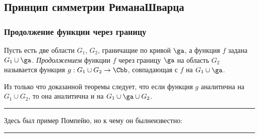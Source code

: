 \documentclass[a4paper]{article}
\newenvironment{petit}
{\par \smallskip \hrule \smallskip \footnotesize}
{\par \smallskip \hrule \smallskip}
\begin{document}
\subsection{Принцип симметрии Римана\ч Шварца}

\subsubsection{Продолжение функции через границу}

\begin{df}
Пусть есть две области $G_1$, $G_2$, граничащие по кривой $\ga$, а функция $f$ задана $G_1\cup\ga$.
\emph{Продолжением} функции $f$ через границу $\ga$ на область $G_2$ называется функция $g:G_1\cup G_2\to\Cbb$,
совпадающая с $f$ на $G_1\cup\ga$.
\end{df}

Из только что доказанной теоремы следует, что если функция $g$ аналитична на $G_1 \cup G_2$,
то она аналитична  и на $G_1\cup \ga\cup G_2$.

\begin{petit}
Здесь был пример Помпейю, но к чему он был\т  неизвестно:
\end{petit}
\end{document}
